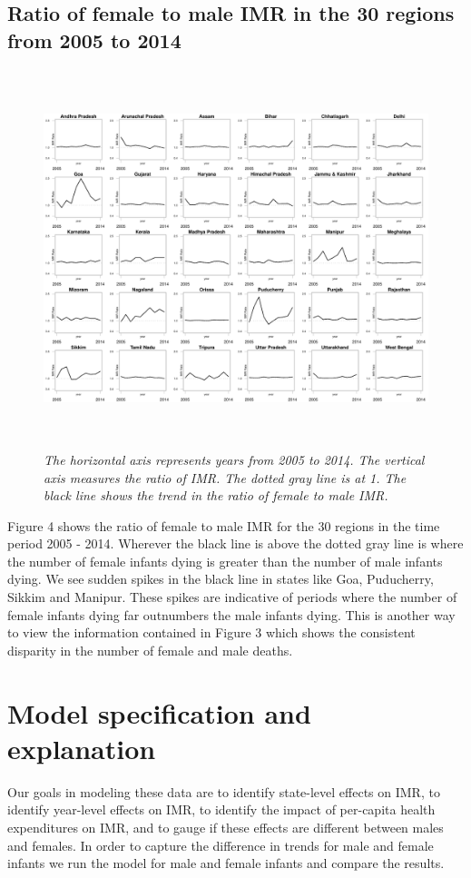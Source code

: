 \documentclass{article}
\begin{document}
\subsection{Ratio of female to male IMR in the 30 regions from 2005 to 2014}
\begin{figure}[H]
   \begin{center}
   \includegraphics[height = 11cm, width = 15cm]{ratio.pdf}
   \end{center}
   \caption{\emph{The horizontal axis represents years from 2005 to 2014. The vertical axis measures the ratio of IMR. The dotted gray line is at 1. The black line shows the trend in the ratio of female to male IMR.}}
\end{figure}

Figure 4 shows the ratio of female to male IMR for the 30 regions in the time period 2005 - 2014. Wherever the black line is above the dotted gray line is where the number of female infants dying is greater than the number of male infants dying. We see sudden spikes in the black line in states like Goa, Puducherry, Sikkim and Manipur. These spikes are indicative of periods where the number of female infants dying far outnumbers the male infants dying. This is another way to view the information contained in Figure 3 which shows the consistent disparity in the number of female and male deaths.

\newpage

\section{Model specification and explanation}
Our goals in modeling these data are to identify state-level effects on IMR, to identify year-level effects on IMR, to identify the impact of per-capita health expenditures on IMR, and to gauge if these effects are different between males and females. In order to capture the difference in trends for male and female infants we run the model for male and female infants and compare the results.\\ 
\end{document}
